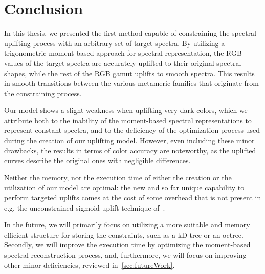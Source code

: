 \chapter*{Conclusion}

In this thesis, we presented the first method capable of constraining the spectral uplifting process with an arbitrary set of target spectra. By utilizing a trigonometric moment-based approach for spectral representation, the RGB values of the target spectra are accurately uplifted to their original spectral shapes, while the rest of the RGB gamut uplifts to smooth spectra. This results in smooth transitions between
the various metameric families that originate from the constraining process.

Our model shows a slight weakness when uplifting very dark colors, which we attribute both to the inability of the moment-based spectral representations to represent constant spectra, and to the deficiency of the optimization process used during the creation of our uplifting model. However, even including these minor drawbacks, the results in terms of color accuracy are noteworthy, as the uplifted curves describe the original ones with negligible differences.

Neither the memory, nor the execution time of either the creation or the utilization of our model are optimal: the new and so far unique capability to perform targeted uplifts comes at the cost of some overhead that is not present in e.g. the unconstrained sigmoid uplift technique of~\citet{upsamplingJakobHanika}.

In the future, we will primarily focus on utilizing a more suitable and memory efficient structure for storing the constraints, such as a kD-tree or an octree. Secondly, we will improve the execution time by optimizing the moment-based spectral reconstruction process, and, furthermore, we will focus on improving other minor deficiencies, reviewed in~\cref{sec:futureWork}.
